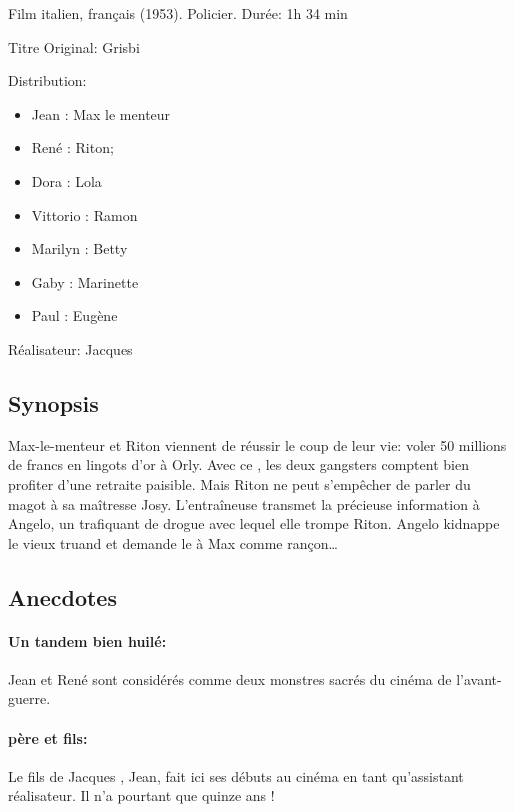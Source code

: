 Film italien, français (1953). Policier. Durée: 1h 34 min

Titre Original: Grisbi

Distribution:

\begin{itemize}
	\item Jean : Max le menteur	
	\item René : Riton;
	\item Dora : Lola	
	\item Vittorio : Ramon	
	\item Marilyn : Betty	
	\item Gaby : Marinette	
	\item Paul : Eugène
\end{itemize}

Réalisateur: Jacques 


\subsection*{Synopsis}

Max-le-menteur et Riton viennent de réussir le coup de leur vie: voler 50 millions de francs en lingots d'or à Orly. Avec ce , les deux gangsters comptent bien profiter d'une retraite paisible. Mais Riton ne peut s'empêcher de parler du magot à sa maîtresse Josy. L'entraîneuse transmet la précieuse information à Angelo, un trafiquant de drogue avec lequel elle trompe Riton. Angelo kidnappe le vieux truand et demande le  à Max comme rançon\dots


\subsection*{Anecdotes}

\paragraph{Un tandem bien huilé:} Jean  et René  sont considérés comme deux monstres sacrés du cinéma de l'avant-guerre.

\paragraph{ père et fils:} Le fils de Jacques , Jean, fait ici ses débuts au cinéma en tant qu'assistant réalisateur. Il n'a pourtant que quinze ans !

